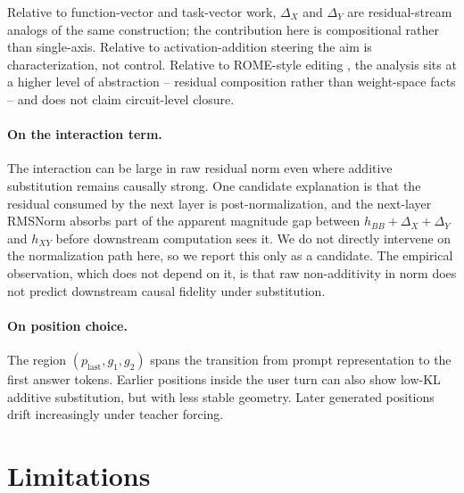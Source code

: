 \documentclass[11pt]{article}
\begin{document}
Relative to function-vector \cite{todd2024function} and task-vector \cite{hendel2023icltask} work, $\Delta_X$ and $\Delta_Y$ are residual-stream analogs of the same construction; the contribution here is compositional rather than single-axis. Relative to activation-addition steering \cite{turner2023actadd,zou2023representation} the aim is characterization, not control. Relative to ROME-style editing \cite{meng2022rome}, the analysis sits at a higher level of abstraction -- residual composition rather than weight-space facts -- and does not claim circuit-level closure.

\paragraph{On the interaction term.}
The interaction can be large in raw residual norm even where additive substitution remains causally strong. One candidate explanation is that the residual consumed by the next layer is post-normalization, and the next-layer RMSNorm absorbs part of the apparent magnitude gap between $h_{BB} + \Delta_X + \Delta_Y$ and $h_{XY}$ before downstream computation sees it. We do not directly intervene on the normalization path here, so we report this only as a candidate. The empirical observation, which does not depend on it, is that raw non-additivity in norm does not predict downstream causal fidelity under substitution.

\paragraph{On position choice.}
The region $(p_{\text{last}}, g_1, g_2)$ spans the transition from prompt representation to the first answer tokens. Earlier positions inside the user turn can also show low-KL additive substitution, but with less stable geometry. Later generated positions drift increasingly under teacher forcing.

\section{Limitations}
\end{document}
